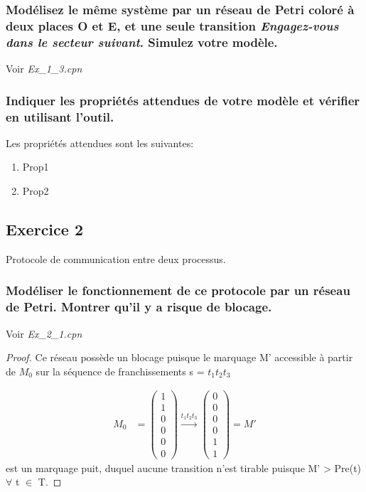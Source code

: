 \documentclass[french]{article}
\begin{document}
\subsubsection{Modélisez le même système par un réseau de Petri coloré à deux places O et E, et une seule transition
  \textit{Engagez-vous dans le secteur suivant}. Simulez votre modèle.}
Voir \textit{Ex\_1\_3.cpn}
\subsubsection{Indiquer les propriétés attendues de votre modèle et vérifier en utilisant l’outil.}
Les propriétés attendues sont les suivantes:
\begin{enumerate}
\item Prop1
\item Prop2
\end{enumerate}



\subsection{Exercice 2}
Protocole de communication entre deux processus.
\subsubsection{Modéliser le fonctionnement de ce protocole par un réseau de Petri. Montrer qu’il y a risque de
  blocage.}
Voir \textit{Ex\_2\_1.cpn}
\begin{proof}
  Ce réseau possède un blocage puisque le marquage M' accessible à partir de $M_0$ sur la séquence de franchissements s = $t_1
  t_2 t_3$

  \begin{align*}
    M_0 &= \begin{pmatrix}
      1 \\
      1 \\
      0 \\
      0 \\
      0 \\
      0
    \end{pmatrix} \xrightarrow{t_1 t_2 t_3}
    \begin{pmatrix}
      0 \\
      0 \\
      0 \\
      0 \\
      1 \\
      1
    \end{pmatrix} = M'
  \end{align*}
  est un marquage puit, duquel aucune transition n'est tirable puisque M' > Pre(t) $\forall$ t $\in$ T.
\end{proof}
\end{document}
